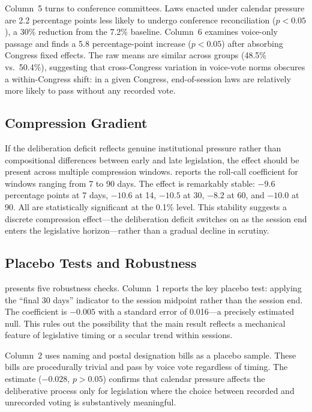 \documentclass[12pt]{article}
\begin{document}
Column~5 turns to conference committees. Laws enacted under calendar pressure are 2.2 percentage points less likely to undergo conference reconciliation ($p < 0.05$), a 30\% reduction from the 7.2\% baseline. Column~6 examines voice-only passage and finds a 5.8 percentage-point increase ($p < 0.05$) after absorbing Congress fixed effects. The raw means are similar across groups (48.5\% vs.\ 50.4\%), suggesting that cross-Congress variation in voice-vote norms obscures a within-Congress shift: in a given Congress, end-of-session laws are relatively more likely to pass without any recorded vote.

\subsection{Compression Gradient}



If the deliberation deficit reflects genuine institutional pressure rather than compositional differences between early and late legislation, the effect should be present across multiple compression windows.  reports the roll-call coefficient for windows ranging from 7 to 90 days. The effect is remarkably stable: $-9.6$ percentage points at 7 days, $-10.6$ at 14, $-10.5$ at 30, $-8.2$ at 60, and $-10.0$ at 90. All are statistically significant at the 0.1\% level. This stability suggests a discrete compression effect---the deliberation deficit switches on as the session end enters the legislative horizon---rather than a gradual decline in scrutiny.

\subsection{Placebo Tests and Robustness}



 presents five robustness checks. Column~1 reports the key placebo test: applying the ``final 30 days'' indicator to the session midpoint rather than the session end. The coefficient is $-0.005$ with a standard error of 0.016---a precisely estimated null. This rules out the possibility that the main result reflects a mechanical feature of legislative timing or a secular trend within sessions.

Column~2 uses naming and postal designation bills as a placebo sample. These bills are procedurally trivial and pass by voice vote regardless of timing. The estimate ($-0.028$, $p > 0.05$) confirms that calendar pressure affects the deliberative process only for legislation where the choice between recorded and unrecorded voting is substantively meaningful.
\end{document}
